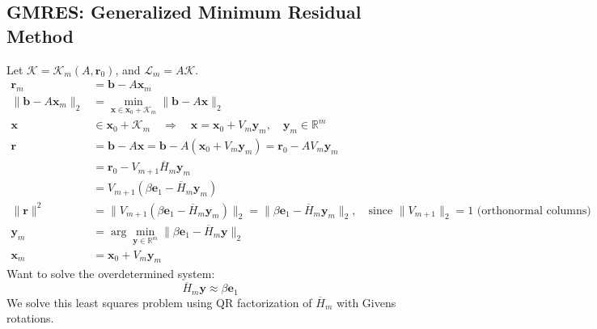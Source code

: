 \subsection{GMRES: Generalized Minimum Residual Method}
Let $\mathcal{K} = \mathcal{K}_m(A, \mathbf{r}_0)$, and $\mathcal{L}_m = A\mathcal{K}$.
\begin{align*}
    \mathbf{r}_m                     & = \mathbf{b} - A\mathbf{x}_m                                                                                                                                                                    \\
    \|\mathbf{b} - A\mathbf{x}_m\|_2 & = \min_{\mathbf{x} \in \mathbf{x}_0 + \mathcal{K}_m} \|\mathbf{b} - A\mathbf{x}\|_2                                                                                                             \\
    \mathbf{x}                       & \in \mathbf{x}_0 + \mathcal{K}_m \quad \Rightarrow \quad \mathbf{x} = \mathbf{x}_0 + V_m \mathbf{y}_m, \quad \mathbf{y}_m \in \mathbb{R}^m                                                      \\
    \mathbf{r}                       & = \mathbf{b} - A\mathbf{x} = \mathbf{b} - A(\mathbf{x}_0 + V_m \mathbf{y}_m) = \mathbf{r}_0 - AV_m \mathbf{y}_m                                                                                 \\
                                     & = \mathbf{r}_0 - V_{m+1} \overline{H}_m \mathbf{y}_m                                                                                                                                            \\
                                     & = V_{m+1}(\beta \mathbf{e}_1 - \overline{H}_m \mathbf{y}_m)                                                                                                                                     \\
    \|\mathbf{r}\|^2                 & = \|V_{m+1}(\beta \mathbf{e}_1 - \overline{H}_m \mathbf{y}_m)\|_2 = \|\beta \mathbf{e}_1 - \overline{H}_m \mathbf{y}_m\|_2, \quad \text{since } \|V_{m+1}\|_2 = 1 \text{ (orthonormal columns)} \\
    \mathbf{y}_m                     & = \arg\min_{\mathbf{y} \in \mathbb{R}^m} \|\beta \mathbf{e}_1 - \overline{H}_m \mathbf{y}\|_2                                                                                                   \\
    \mathbf{x}_m                     & = \mathbf{x}_0 + V_m \mathbf{y}_m
\end{align*}
Want to solve the overdetermined system:
\[
    \overline{H}_m \mathbf{y} \approx \beta \mathbf{e}_1
\]
We solve this least squares problem using QR factorization of $\overline{H}_m$ with Givens rotations.

